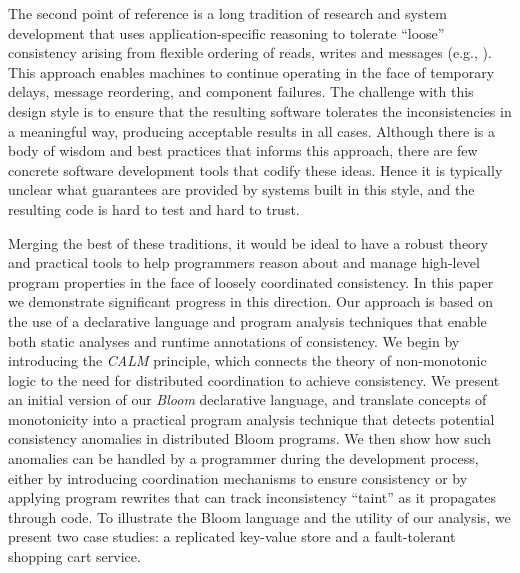 The second point of reference is a long tradition of research and system development that uses application-specific reasoning to tolerate ``loose'' consistency arising from flexible ordering of reads, writes and messages (e.g., \cite{sagas,beyond,quicksand,base,bayou}). This approach enables machines to continue operating in the face of temporary delays, message reordering, and component failures.  
The challenge with this design style is to ensure that the resulting software tolerates the inconsistencies in a meaningful way, producing acceptable results in all cases.  Although there is a body of wisdom and best practices that informs this approach, there are few concrete software development tools that codify these ideas.  Hence it is typically unclear what guarantees are provided by systems built in this style, and the resulting code is hard to test and hard to trust.  

Merging the best of these traditions, it would be ideal to have a robust theory
and practical tools to help programmers reason about and manage high-level
program properties in the face of loosely coordinated consistency.  In this
paper we demonstrate significant progress in this direction.  Our approach is
based on the use of a declarative language and program analysis techniques that
enable both static analyses and runtime annotations of consistency.  We begin by
introducing the \emph{CALM} principle, which connects
the theory of non-monotonic logic to the need for distributed coordination to
achieve consistency.  We present an initial version of our {\em Bloom}
declarative language, and translate concepts of monotonicity into a practical
program analysis technique that detects potential consistency anomalies in
distributed Bloom programs.  We then show how such anomalies can be handled by a
programmer during the development process, either by introducing coordination
mechanisms to ensure consistency or by applying program rewrites that can track
inconsistency ``taint'' as it propagates through code.  To illustrate the Bloom
language and the utility of our analysis, we present two case studies: a
replicated key-value store and a fault-tolerant shopping cart service.


